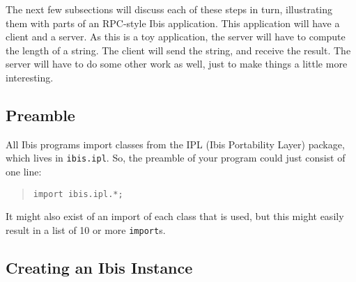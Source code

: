 \documentclass[10pt]{article}
\newcommand{\mysubsection}[1]{\subsection{#1}\label{#1}}
\begin{document}
The next few subsections will discuss each of these steps in turn,
illustrating them with parts of an RPC-style Ibis application.
This application will have a client and a server. As this is a toy
application, the server will have to compute the length of a string.
The client will send the string, and receive the result.
The server will have to do some other work as well, just to make
things a little more interesting.

\subsection{Preamble}

All Ibis programs import classes from the IPL (Ibis
Portability Layer) package, which lives in
\verb+ibis.ipl+.
So, the preamble of your program could just consist of one line:
\begin{quote}
\begin{verbatim}
import ibis.ipl.*;
\end{verbatim}
\end{quote}
It might also exist of an import of each class that is used,
but this might easily result in a list of 10 or more \verb+import+s.

\mysubsection{Creating an Ibis Instance}
\end{document}
